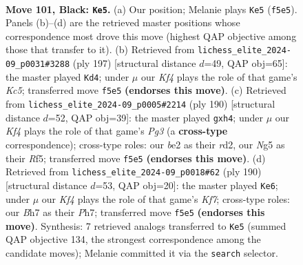 \documentclass[11pt]{article}
\begin{document}
\clearpage

\begin{figure}[p]\centering
\begin{subfigure}{0.46\textwidth}\centering
\resizebox{\linewidth}{!}{%
\newchessgame
\chessboard[
  setfen={8/7b/4N2Q/5kn1/1p6/4K3/4B3/8 b - - 3 101},
  showmover=false,
  pgfstyle=straightmove, color=movearrow, markmove={f5-e5}
]}
\caption{}
\end{subfigure}\hfill
\begin{subfigure}{0.46\textwidth}\centering
\resizebox{\linewidth}{!}{%
\newchessgame
\chessboard[
  setfen={8/8/4K3/3N4/1nk5/8/8/8 b - - 91 99},
  showmover=false,
  pgfstyle=straightmove, color=movearrow, markmove={c4-d4}
]}
\caption{}
\end{subfigure}
\\[4pt]
\begin{subfigure}{0.46\textwidth}\centering
\resizebox{\linewidth}{!}{%
\newchessgame
\chessboard[
  setfen={8/4k1N1/8/5R1p/7n/6P1/3r4/5K2 w - - 0 96},
  showmover=false,
  pgfstyle=straightmove, color=movearrow, markmove={g3-h4}
]}
\caption{}
\end{subfigure}\hfill
\begin{subfigure}{0.46\textwidth}\centering
\resizebox{\linewidth}{!}{%
\newchessgame
\chessboard[
  setfen={7q/2k2K1P/5N2/8/8/8/8/8 w - - 6 96},
  showmover=false,
  pgfstyle=straightmove, color=movearrow, markmove={f7-e6}
]}
\caption{}
\end{subfigure}
\caption{\textbf{Move 101, Black: \texttt{Ke5}.} (a) Our position; Melanie plays \texttt{Ke5} (\texttt{f5e5}). Panels (b)--(d) are the retrieved master positions whose correspondence most drove this move (highest QAP objective among those that transfer to it). (b) Retrieved from \texttt{lichess\_elite\_2024-09\_p0031\#3288} (ply 197) [structural distance $d$=49, QAP obj=65]: the master played \texttt{Kd4}; under $\mu$ our \emph{Kf4} plays the role of that game's \emph{Kc5}; transferred move \texttt{f5e5} \textbf{(endorses this move)}. (c) Retrieved from \texttt{lichess\_elite\_2024-09\_p0005\#2214} (ply 190) [structural distance $d$=52, QAP obj=39]: the master played \texttt{gxh4}; under $\mu$ our \emph{Kf4} plays the role of that game's \emph{Pg3} (a \textbf{cross-type} correspondence); cross-type roles: our \emph{b}e2 as their \emph{r}d2, our \emph{N}g5 as their \emph{R}f5; transferred move \texttt{f5e5} \textbf{(endorses this move)}. (d) Retrieved from \texttt{lichess\_elite\_2024-09\_p0018\#62} (ply 190) [structural distance $d$=53, QAP obj=20]: the master played \texttt{Ke6}; under $\mu$ our \emph{Kf4} plays the role of that game's \emph{Kf7}; cross-type roles: our \emph{B}h7 as their \emph{P}h7; transferred move \texttt{f5e5} \textbf{(endorses this move)}. Synthesis: 7 retrieved analogs transferred to \texttt{Ke5} (summed QAP objective 134, the strongest correspondence among the candidate moves); Melanie committed it via the \texttt{search} selector.}
\label{fig:thought-m201}
\end{figure}
\end{document}
